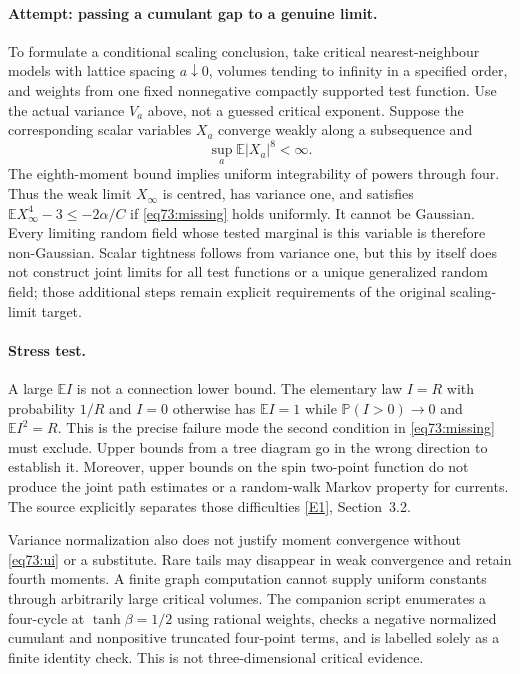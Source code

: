 \documentclass[11pt,a4paper]{article}
\numberwithin{equation}{section}
\newcommand{\eref}[2]{\hyperlink{extra:#1:#2}{[E#2]}}
\begin{document}
\paragraph{Attempt: passing a cumulant gap to a genuine limit.}
To formulate a conditional scaling conclusion, take critical nearest-neighbour
models with lattice spacing $a\downarrow0$, volumes tending to infinity
in a specified order, and weights from one fixed nonnegative compactly
supported test function. Use the actual variance $V_a$ above, not a guessed
critical exponent. Suppose the corresponding scalar variables $X_a$ converge
weakly along a subsequence and
\begin{equation}\label{eq73:ui}
 \sup_a\mathbb E|X_a|^8<\infty.
\end{equation}
The eighth-moment bound implies uniform integrability of powers through
four. Thus the weak limit $X_\infty$ is centred, has variance one, and
satisfies
$\mathbb E X_\infty^4-3\leq-2\alpha/C$ if
\eqref{eq73:missing} holds uniformly. It cannot be Gaussian.
Every limiting random field whose tested marginal is this variable is
therefore non-Gaussian. Scalar tightness follows from variance one, but
this by itself does not construct joint limits for all test functions or
a unique generalized random field; those additional steps remain explicit
requirements of the original scaling-limit target.

\paragraph{Stress test.}
A large $\mathbb E I$ is not a connection lower bound. The elementary law
$I=R$ with probability $1/R$ and $I=0$ otherwise has $\mathbb E I=1$
while $\mathbb P(I>0)\to0$ and $\mathbb E I^2=R$.
This is the precise failure mode the second condition in
\eqref{eq73:missing} must exclude. Upper bounds from a tree diagram go in
the wrong direction to establish it. Moreover, upper bounds on the
spin two-point function do not produce the joint path estimates or a
random-walk Markov property for currents. The source explicitly separates
those difficulties \eref{30006710}{1}, Section~3.2.

Variance normalization also does not justify moment convergence without
\eqref{eq73:ui} or a substitute. Rare tails may disappear in weak
convergence and retain fourth moments. A finite graph computation cannot
supply uniform constants through arbitrarily large critical volumes.
The companion script enumerates a four-cycle at $\tanh\beta=1/2$ using
rational weights, checks a negative normalized cumulant and nonpositive
truncated four-point terms, and is labelled solely as a finite identity
check. This is not three-dimensional critical evidence.
\end{document}
